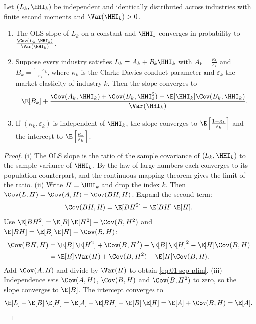 \begin{proposition}\label{prop:01-scp-plim}
Let $(L_k, \HHI_k)$ be independent and identically distributed across industries with finite second
moments and $\Var(\HHI_k) > 0$.
\begin{enumerate}[label=(\roman*)]
\item The OLS slope of $L_k$ on a constant and $\HHI_k$ converges in probability to
$\frac{\Cov(L_k, \HHI_k)}{\Var(\HHI_k)}$.
\item Suppose every industry satisfies $L_k = A_k + B_k \HHI_k$ with $A_k = \frac{\kappa_k}{\varepsilon_k}$
and $B_k = \frac{1 - \kappa_k}{\varepsilon_k}$, where $\kappa_k$ is the Clarke-Davies conduct parameter and
$\varepsilon_k$ the market elasticity of industry $k$. Then the slope converges to
\begin{equation}\label{eq:01-scp-plim}
\E[B_k] + \frac{\Cov(A_k, \HHI_k) + \Cov(B_k, \HHI_k^2) - \E[\HHI_k] \Cov(B_k, \HHI_k)}{\Var(\HHI_k)}.
\end{equation}
\item If $(\kappa_k, \varepsilon_k)$ is independent of $\HHI_k$, the slope converges to
$\E\left[\frac{1 - \kappa_k}{\varepsilon_k}\right]$ and the intercept to
$\E\left[\frac{\kappa_k}{\varepsilon_k}\right]$.
\end{enumerate}
\end{proposition}

\begin{proof}
(i) The OLS slope is the ratio of the sample covariance of $(L_k, \HHI_k)$ to the sample variance of
$\HHI_k$. By the law of large numbers each converges to its population counterpart, and the continuous
mapping theorem gives the limit of the ratio. (ii) Write $H = \HHI_k$ and drop the index $k$. Then
$\Cov(L, H) = \Cov(A, H) + \Cov(BH, H)$. Expand the second term:
\[
\Cov(BH, H) = \E[BH^2] - \E[BH]\,\E[H].
\]
Use $\E[BH^2] = \E[B]\,\E[H^2] + \Cov(B, H^2)$ and $\E[BH] = \E[B]\,\E[H] + \Cov(B, H)$:
\begin{align*}
\Cov(BH, H) &= \E[B]\,\E[H^2] + \Cov(B, H^2) - \E[B]\,\E[H]^2 - \E[H] \Cov(B, H) \\
            &= \E[B] \Var(H) + \Cov(B, H^2) - \E[H] \Cov(B, H).
\end{align*}
Add $\Cov(A, H)$ and divide by $\Var(H)$ to obtain \eqref{eq:01-scp-plim}. (iii) Independence sets
$\Cov(A, H)$, $\Cov(B, H)$ and $\Cov(B, H^2)$ to zero, so the slope converges to $\E[B]$. The intercept
converges to
\[
\E[L] - \E[B]\,\E[H] = \E[A] + \E[BH] - \E[B]\,\E[H] = \E[A] + \Cov(B, H) = \E[A].
\qedhere
\]
\end{proof}

